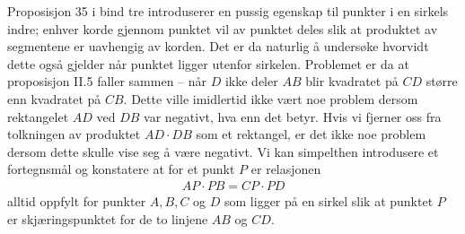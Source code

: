 \documentclass[norsk,twoside,utf8]{article}
\newcommand{\EQU}[1] { \begin{equation*} \begin{split} #1 \end{split} \end{equation*} }
\begin{document}
\begin{multicols}{2}
\noindent
Proposisjon 35 i bind tre introduserer en pussig egenskap til punkter i en sirkels indre; enhver korde gjennom punktet vil av punktet deles slik at produktet av segmentene er uavhengig av korden. Det er da naturlig å undersøke hvorvidt dette også gjelder når punktet ligger utenfor sirkelen. Problemet er da at proposisjon II.5 faller sammen -- når $D$ ikke deler $AB$ blir kvadratet på $CD$ større enn kvadratet på $CB$. Dette ville imidlertid ikke vært noe problem dersom rektangelet $AD$ ved $DB$ var negativt, hva enn det betyr. Hvis vi fjerner oss fra tolkningen av produktet $AD\cdot DB$ som et rektangel, er det ikke noe problem dersom dette skulle vise seg å være negativt. Vi kan simpelthen introdusere et fortegnsmål og konstatere at for et punkt $P$ er relasjonen
\EQU{
AP\cdot PB = CP\cdot PD
}
alltid oppfylt for punkter $A,B,C$ og $D$ som ligger på en sirkel slik at punktet $P$ er skjæringspunktet for de to linjene $AB$ og $CD$.

\vspace{2cm}

\begin{center}
\end{center}

\end{multicols}
\end{document}
